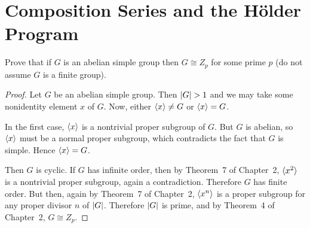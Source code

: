 \section{Composition Series and the H\"older Program}

 Prove that if $G$ is an abelian simple group then
$G\cong Z_p$ for some prime $p$ (do not assume $G$ is a finite group).
\begin{proof}
  Let $G$ be an abelian simple group. Then $\lvert{G}\rvert > 1$ and we may
  take some nonidentity element $x$ of $G$. Now, either $\langle{x}\rangle\neq G$
  or $\langle{x}\rangle = G$.

  In the first case, $\langle{x}\rangle$ is a nontrivial proper subgroup of
  $G$. But $G$ is abelian, so $\langle{x}\rangle$ must be a normal proper
  subgroup, which contradicts the fact that $G$ is simple. Hence
  $\langle{x}\rangle = G$.

  Then $G$ is cyclic. If $G$ has infinite order, then by Theorem~7 of
  Chapter~2, $\langle{x^2}\rangle$ is a nontrivial proper subgroup, again a
  contradiction. Therefore $G$ has finite order. But then, again by
  Theorem~7 of Chapter~2, $\langle{x^n}\rangle$ is a proper subgroup for any
  proper divisor $n$ of $\lvert{G}\rvert$. Therefore $\lvert{G}\rvert$ is prime, and
  by Theorem~4 of Chapter~2, $G\cong Z_p$.
\end{proof}

